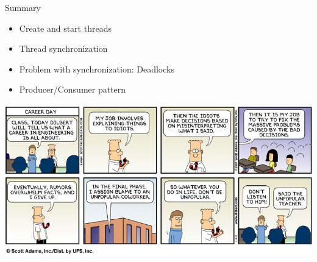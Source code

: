 \begin{frame}{Summary}
  \begin{itemize}
  \item Create and start threads
  \item Thread synchronization
  \item Problem with synchronization: Deadlocks
  \item Producer/Consumer pattern
  \end{itemize}


  \begin{center}
    \includegraphics[width=\textwidth]{figures/dilbert-2}
  \end{center}
\end{frame}


